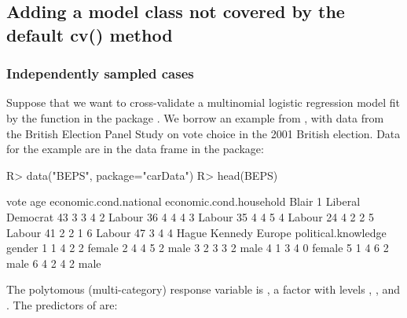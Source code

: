 \documentclass[
]{jss}
\begin{document}
\hypertarget{adding-a-model-class-not-covered-by-the-default-cv-method}{%
\subsection{Adding a model class not covered by the default cv()
method}\label{adding-a-model-class-not-covered-by-the-default-cv-method}}

\hypertarget{independently-sampled-cases}{%
\subsubsection{Independently sampled
cases}\label{independently-sampled-cases}}

Suppose that we want to cross-validate a multinomial logistic regression
model fit by the  function in the  package
\citep{VenablesRipley:2002}. We borrow an example from \citet[Sec.
14.2.1]{Fox:2016}, with data from the British Election Panel Study on
vote choice in the 2001 British election. Data for the example are in
the  data frame in the  package:

\begin{CodeChunk}
\begin{CodeInput}
R> data("BEPS", package="carData")
R> head(BEPS)
\end{CodeInput}
\begin{CodeOutput}
              vote age economic.cond.national economic.cond.household Blair
1 Liberal Democrat  43                      3                       3     4
2           Labour  36                      4                       4     4
3           Labour  35                      4                       4     5
4           Labour  24                      4                       2     2
5           Labour  41                      2                       2     1
6           Labour  47                      3                       4     4
  Hague Kennedy Europe political.knowledge gender
1     1       4      2                   2 female
2     4       4      5                   2   male
3     2       3      3                   2   male
4     1       3      4                   0 female
5     1       4      6                   2   male
6     4       2      4                   2   male
\end{CodeOutput}
\end{CodeChunk}

The polytomous (multi-category) response variable is , a
factor with levels , , and
. The predictors of  are:
\end{document}
